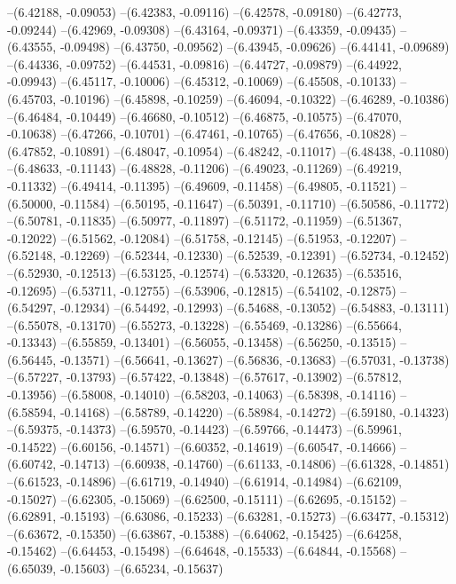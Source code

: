 --(6.42188, -0.09053)
--(6.42383, -0.09116)
--(6.42578, -0.09180)
--(6.42773, -0.09244)
--(6.42969, -0.09308)
--(6.43164, -0.09371)
--(6.43359, -0.09435)
--(6.43555, -0.09498)
--(6.43750, -0.09562)
--(6.43945, -0.09626)
--(6.44141, -0.09689)
--(6.44336, -0.09752)
--(6.44531, -0.09816)
--(6.44727, -0.09879)
--(6.44922, -0.09943)
--(6.45117, -0.10006)
--(6.45312, -0.10069)
--(6.45508, -0.10133)
--(6.45703, -0.10196)
--(6.45898, -0.10259)
--(6.46094, -0.10322)
--(6.46289, -0.10386)
--(6.46484, -0.10449)
--(6.46680, -0.10512)
--(6.46875, -0.10575)
--(6.47070, -0.10638)
--(6.47266, -0.10701)
--(6.47461, -0.10765)
--(6.47656, -0.10828)
--(6.47852, -0.10891)
--(6.48047, -0.10954)
--(6.48242, -0.11017)
--(6.48438, -0.11080)
--(6.48633, -0.11143)
--(6.48828, -0.11206)
--(6.49023, -0.11269)
--(6.49219, -0.11332)
--(6.49414, -0.11395)
--(6.49609, -0.11458)
--(6.49805, -0.11521)
--(6.50000, -0.11584)
--(6.50195, -0.11647)
--(6.50391, -0.11710)
--(6.50586, -0.11772)
--(6.50781, -0.11835)
--(6.50977, -0.11897)
--(6.51172, -0.11959)
--(6.51367, -0.12022)
--(6.51562, -0.12084)
--(6.51758, -0.12145)
--(6.51953, -0.12207)
--(6.52148, -0.12269)
--(6.52344, -0.12330)
--(6.52539, -0.12391)
--(6.52734, -0.12452)
--(6.52930, -0.12513)
--(6.53125, -0.12574)
--(6.53320, -0.12635)
--(6.53516, -0.12695)
--(6.53711, -0.12755)
--(6.53906, -0.12815)
--(6.54102, -0.12875)
--(6.54297, -0.12934)
--(6.54492, -0.12993)
--(6.54688, -0.13052)
--(6.54883, -0.13111)
--(6.55078, -0.13170)
--(6.55273, -0.13228)
--(6.55469, -0.13286)
--(6.55664, -0.13343)
--(6.55859, -0.13401)
--(6.56055, -0.13458)
--(6.56250, -0.13515)
--(6.56445, -0.13571)
--(6.56641, -0.13627)
--(6.56836, -0.13683)
--(6.57031, -0.13738)
--(6.57227, -0.13793)
--(6.57422, -0.13848)
--(6.57617, -0.13902)
--(6.57812, -0.13956)
--(6.58008, -0.14010)
--(6.58203, -0.14063)
--(6.58398, -0.14116)
--(6.58594, -0.14168)
--(6.58789, -0.14220)
--(6.58984, -0.14272)
--(6.59180, -0.14323)
--(6.59375, -0.14373)
--(6.59570, -0.14423)
--(6.59766, -0.14473)
--(6.59961, -0.14522)
--(6.60156, -0.14571)
--(6.60352, -0.14619)
--(6.60547, -0.14666)
--(6.60742, -0.14713)
--(6.60938, -0.14760)
--(6.61133, -0.14806)
--(6.61328, -0.14851)
--(6.61523, -0.14896)
--(6.61719, -0.14940)
--(6.61914, -0.14984)
--(6.62109, -0.15027)
--(6.62305, -0.15069)
--(6.62500, -0.15111)
--(6.62695, -0.15152)
--(6.62891, -0.15193)
--(6.63086, -0.15233)
--(6.63281, -0.15273)
--(6.63477, -0.15312)
--(6.63672, -0.15350)
--(6.63867, -0.15388)
--(6.64062, -0.15425)
--(6.64258, -0.15462)
--(6.64453, -0.15498)
--(6.64648, -0.15533)
--(6.64844, -0.15568)
--(6.65039, -0.15603)
--(6.65234, -0.15637)
